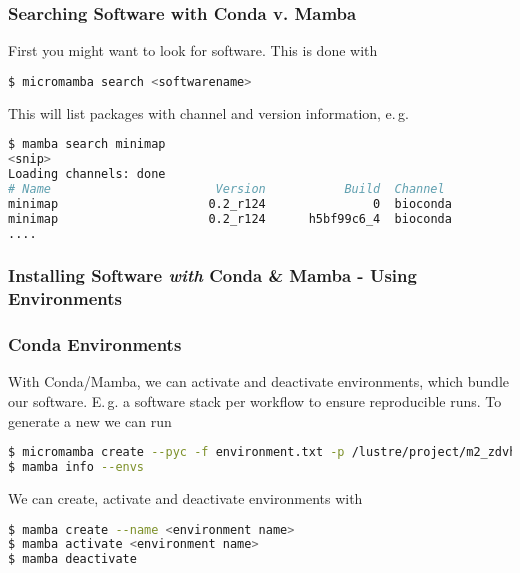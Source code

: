 \begin{frame}[fragile]
  \frametitle{Searching Software with Conda v. Mamba}
  First you might want to look for software. This is done with
  \begin{lstlisting}[language=Bash, style=Shell]
$ micromamba search <softwarename>
  \end{lstlisting}
  \pause
  \pause
  This will list packages with channel and version information, e.\,g.
  \begin{lstlisting}[language=Bash, style=Shell, basicstyle=\tiny]
$ mamba search minimap
<snip>
Loading channels: done
# Name                       Version           Build  Channel             
minimap                     0.2_r124               0  bioconda            
minimap                     0.2_r124      h5bf99c6_4  bioconda
....
  \end{lstlisting}
\end{frame}


\begin{frame}[fragile]
  \frametitle{Installing Software \emph{with} Conda \& Mamba - Using Environments}
\end{frame}


\begin{frame}[fragile]
  \frametitle{Conda Environments}
  With Conda/Mamba, we can activate and deactivate environments, which bundle our software. E.\,g. a software stack per workflow to ensure reproducible runs.
    \pause
  To generate a new we can run
  \begin{lstlisting}[language=Bash, style=Shell]
$ micromamba create --pyc -f environment.txt -p /lustre/project/m2_zdvhpc/meesters/test_micromamba
$ mamba info --envs
  \end{lstlisting}
  We can create, activate and deactivate environments with
  \begin{lstlisting}[language=Bash, style=Shell]
$ mamba create --name <environment name>
$ mamba activate <environment name>
$ mamba deactivate
  \end{lstlisting}
\end{frame}




